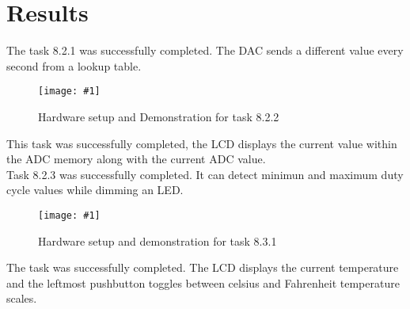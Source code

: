 \documentclass[journal]{IEEEtran}
\newcommand\createfigure[2]{
  \begin{figure}[H]
    \centering \texttt{[image: \#1]}
    \caption{#2}
  \end{figure}}
\begin{document}
\section{Results}
The task 8.2.1 was successfully completed. The DAC sends a different value every second from a lookup table.\\
\createfigure{./Figures/8.2.2.jpeg}{Hardware setup and Demonstration for task 8.2.2}
This task was successfully completed, the LCD displays the current value within the ADC memory along with the current ADC value.\\
Task 8.2.3 was successfully completed. It can detect minimun and maximum duty cycle values while dimming an LED.
\createfigure{./Figures/8.3.1.jpeg}{Hardware setup and demonstration for task 8.3.1}
The task was successfully completed. The LCD displays the current temperature and the leftmost pushbutton toggles between celsius and Fahrenheit temperature scales.
\nocite{rojasEmbeddedSystemsDesign2016}
\nocite{LCDControllerDatasheets}


\end{document}
